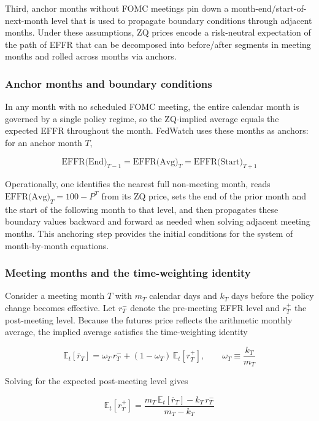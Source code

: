 Third, anchor months without FOMC meetings pin down a month-end/start-of-next-month level that is used to propagate boundary conditions through adjacent months. Under these assumptions, ZQ prices encode a risk-neutral expectation of the path of EFFR that can be decomposed into before/after segments in meeting months and rolled across months via anchors.

\subsubsection{Anchor months and boundary conditions}

In any month with no scheduled FOMC meeting, the entire calendar month is governed by a single policy regime, so the ZQ-implied average equals the expected EFFR throughout the month. FedWatch uses these months as anchors: for an anchor month $T$,

$$\text{EFFR(End)}_{T-1}=\text{EFFR(Avg)}_{T}=\text{EFFR(Start)}_{T+1}$$

Operationally, one identifies the nearest full non-meeting month, reads $\text{EFFR(Avg)}_{T}=100-P^T$ from its ZQ price, sets the end of the prior month and the start of the following month to that level, and then propagates these boundary values backward and forward as needed when solving adjacent meeting months. This anchoring step provides the initial conditions for the system of month-by-month equations.

\subsubsection{Meeting months and the time-weighting identity}

Consider a meeting month $T$ with $m_T$ calendar days and $k_T$ days before the policy change becomes effective. Let $r_T^{-}$ denote the pre-meeting EFFR level and $r_T^{+}$ the post-meeting level. Because the futures price reflects the arithmetic monthly average, the implied average satisfies the time-weighting identity

$$\mathbb{E}_t[\overline{r}_T] = \omega_T\, r_T^{-} + (1-\omega_T)\,\mathbb{E}_t[r_T^{+}], \qquad \omega_T \equiv \frac{k_T}{m_T}
$$

Solving for the expected post-meeting level gives

$$\mathbb{E}_t[r_T^{+}] = \frac{m_T\,\mathbb{E}_t[\overline{r}_T] - k_T\, r_T^{-}}{m_T-k_T}$$

